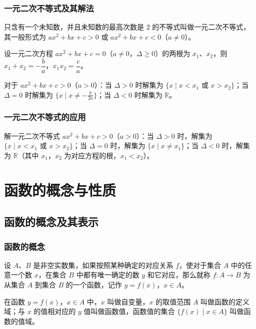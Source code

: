 \documentclass[lang=cn,newtx,10pt,scheme=chinese,nofont]{elegantbook}
\begin{document}
\subsection{一元二次不等式及其解法}
\begin{definition}[一元二次不等式]
只含有一个未知数，并且未知数的最高次数是 $2$ 的不等式叫做一元二次不等式，其一般形式为 $ax^2+bx+c>0$ 或 $ax^2+bx+c<0$（$a \neq 0$）。
\end{definition}
\begin{theorem}[韦达定理]
设一元二次方程 $ax^2+bx+c=0$（$a \neq 0$，$\Delta \geq 0$）的两根为 $x_1$、$x_2$，则 $x_1+x_2=-\dfrac{b}{a}$，$x_1 x_2=\dfrac{c}{a}$。
\end{theorem}
\begin{corollary}[一元二次不等式的解集与判别式]
对于 $ax^2+bx+c>0$（$a>0$）：当 $\Delta>0$ 时解集为 $\{x \mid x<x_1 \text{ 或 } x>x_2\}$；当 $\Delta=0$ 时解集为 $\{x \mid x \neq -\tfrac{b}{2a}\}$；当 $\Delta<0$ 时解集为 $\mathbb{R}$。
\end{corollary}
\subsection{一元二次不等式的应用}
\begin{definition}[一元二次不等式的解法]
解一元二次不等式 $ax^2+bx+c>0$（$a>0$）：当 $\Delta>0$ 时，解集为 $\{x \mid x<x_1 \text{ 或 } x>x_2\}$；当 $\Delta=0$ 时，解集为 $\{x \mid x \neq x_1\}$；当 $\Delta<0$ 时，解集为 $\mathbb{R}$（其中 $x_1$，$x_2$ 为对应方程的根，$x_1<x_2$）。
\end{definition}

\chapter{函数的概念与性质}

\section{函数的概念及其表示}
\subsection{函数的概念}
\begin{definition}[函数]
设 $A$、$B$ 是非空实数集，如果按照某种确定的对应关系 $f$，使对于集合 $A$ 中的任意一个数 $x$，在集合 $B$ 中都有唯一确定的数 $y$ 和它对应，那么就称 $f:A \to B$ 为从集合 $A$ 到集合 $B$ 的一个函数，记作 $y=f(x)$，$x \in A$。
\end{definition}
\begin{definition}[定义域与值域]
在函数 $y=f(x)$，$x \in A$ 中，$x$ 叫做自变量，$x$ 的取值范围 $A$ 叫做函数的定义域；与 $x$ 的值相对应的 $y$ 值叫做函数值，函数值的集合 $\{f(x) \mid x \in A\}$ 叫做函数的值域。
\end{definition}
\end{document}
